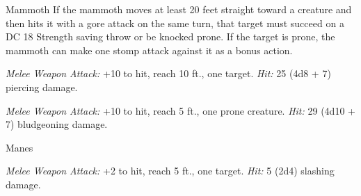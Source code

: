 \documentclass[10pt,a4paper,twoside,twocolumn,openany,nodeprecatedcode]{dndbook}
\begin{document}
\begin{DndMonster}[float=ht]{Mammoth}
\DndMonsterBasics[
armor-class = {13 (natural armor)},
hit-points = {\DndDice{11d12 + 55}},
speed = {40 ft.}
]
\DndMonsterAbilityScores[
 str = 24,
 dex = 9,
 con = 21,
 int = 3,
 wis = 11,
 cha = 6
]
\DndMonsterDetails[
challenge = 6,
]
If the mammoth moves at least 20 feet straight toward a creature and then hits it with a gore attack on the same turn, that target must succeed on a DC 18 Strength saving throw or be knocked prone. If the target is prone, the mammoth can make one stomp attack against it as a bonus action.

\par
{}
\textsl{Melee Weapon Attack:} +10 to hit, reach 10 ft., one target. \textsl{Hit:} 25 (4d8 + 7) piercing damage.

\textsl{Melee Weapon Attack:} +10 to hit, reach 5 ft., one prone creature. \textsl{Hit:} 29 (4d10 + 7) bludgeoning damage.

\end{DndMonster}


\clearpage
{}

\begin{DndMonster}[float=ht]{Manes}
\DndMonsterBasics[
armor-class = {9 (natural armor)},
hit-points = {\DndDice{2d6 + 2}},
speed = {20 ft.}
]
\DndMonsterAbilityScores[
 str = 10,
 dex = 9,
 con = 13,
 int = 3,
 wis = 8,
 cha = 4
]
\DndMonsterDetails[
damage-resistances = {cold, fire, lightning},
damage-immunities = {poison},
senses = {darkvision 60 ft., passive perception 9},
languages = {understands Abyssal but can't speak},
challenge = 1/8,
]
\par
{}
\textsl{Melee Weapon Attack:} +2 to hit, reach 5 ft., one target. \textsl{Hit:} 5 (2d4) slashing damage.

\end{DndMonster}


\clearpage
{}
\end{document}
